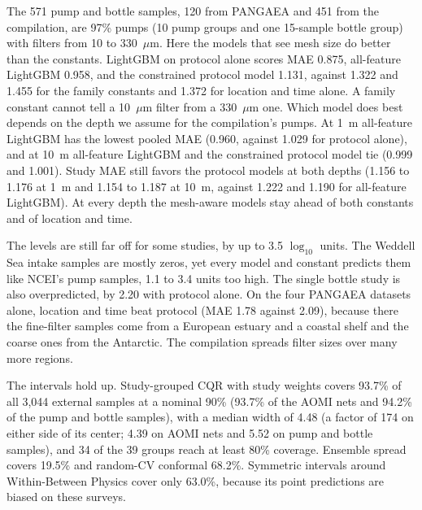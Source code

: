 \documentclass[12pt,a4paper]{report}
\begin{document}
The 571 pump and bottle samples, 120 from PANGAEA and 451 from the compilation, are 97\% pumps (10 pump groups and one 15-sample bottle group) with filters from 10 to 330~$\mu$m. Here the models that see mesh size do better than the constants. LightGBM on protocol alone scores MAE 0.875, all-feature LightGBM 0.958, and the constrained protocol model 1.131, against 1.322 and 1.455 for the family constants and 1.372 for location and time alone. A family constant cannot tell a 10~$\mu$m filter from a 330~$\mu$m one. Which model does best depends on the depth we assume for the compilation's pumps. At 1~m all-feature LightGBM has the lowest pooled MAE (0.960, against 1.029 for protocol alone), and at 10~m all-feature LightGBM and the constrained protocol model tie (0.999 and 1.001). Study MAE still favors the protocol models at both depths (1.156 to 1.176 at 1~m and 1.154 to 1.187 at 10~m, against 1.222 and 1.190 for all-feature LightGBM). At every depth the mesh-aware models stay ahead of both constants and of location and time.

The levels are still far off for some studies, by up to 3.5 $\log_{10}$ units. The Weddell Sea intake samples are mostly zeros, yet every model and constant predicts them like NCEI's pump samples, 1.1 to 3.4 units too high. The single bottle study is also overpredicted, by 2.20 with protocol alone. On the four PANGAEA datasets alone, location and time beat protocol (MAE 1.78 against 2.09), because there the fine-filter samples come from a European estuary and a coastal shelf and the coarse ones from the Antarctic. The compilation spreads filter sizes over many more regions.

The intervals hold up. Study-grouped CQR with study weights covers 93.7\% of all 3,044 external samples at a nominal 90\% (93.7\% of the AOMI nets and 94.2\% of the pump and bottle samples), with a median width of 4.48 (a factor of 174 on either side of its center; 4.39 on AOMI nets and 5.52 on pump and bottle samples), and 34 of the 39 groups reach at least 80\% coverage. Ensemble spread covers 19.5\% and random-CV conformal 68.2\%. Symmetric intervals around Within-Between Physics cover only 63.0\%, because its point predictions are biased on these surveys.
\end{document}

